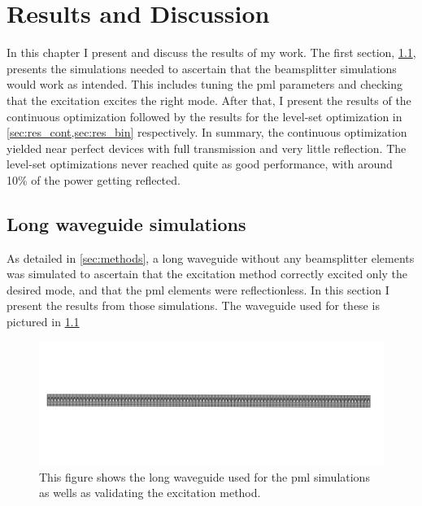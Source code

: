 \chapter{Results and Discussion}

In this chapter I present and discuss the results of my work.
The first section, \cref{sec:long_waveguide}, presents the simulations needed to
ascertain that the beamsplitter simulations would work as intended.
This includes tuning the \gls{pml} parameters and checking that the excitation
excites the right mode.
After that, I present the results of the continuous optimization followed by the
results for the level-set optimization in \cref{sec:res_cont,sec:res_bin}
respectively.
In summary, the continuous optimization yielded near perfect devices with full
transmission and very little reflection.
The level-set optimizations never reached quite as good performance, with around
10\% of the power getting reflected.

\section{Long waveguide simulations}\label{sec:long_waveguide}

As detailed in \cref{sec:methods}, a long waveguide without any beamsplitter
elements was simulated to ascertain that the excitation method correctly excited
only the desired mode, and that the \gls{pml} elements were reflectionless.
In this section I present the results from those simulations.
The waveguide used for these is pictured in \cref{fig:long_waveguide}

\begin{figure}[htpb]
	\centering
	\includegraphics[width=\textwidth]{chapters/results/long_waveguide_geom.png}
	\caption{%
		This figure shows the long waveguide used for the \gls{pml} simulations
		as wells as validating the excitation method.
	}%
	\label{fig:long_waveguide}
\end{figure}

